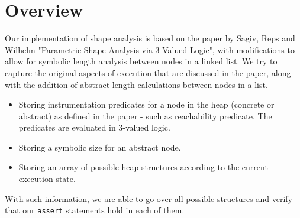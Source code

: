 \section*{Overview}
Our implementation of shape analysis is based on the paper by Sagiv, Reps and Wilhelm "Parametric Shape Analysis via 3-Valued Logic", with modifications to allow for symbolic length analysis between nodes in a linked list. We try to capture the original aspects of execution that are discussed in the paper, along with the addition of abstract length calculations between nodes in a list.
\begin{itemize}
	\item Storing instrumentation predicates for a node in the heap (concrete or abstract) as defined in the paper - such as reachability predicate. The predicates are evaluated in 3-valued logic.
	\item Storing a symbolic size for an abstract node.
	\item Storing an array of possible heap structures according to the current execution state.
\end{itemize}
With such information, we are able to go over all possible structures and verify that our \texttt{assert} statements hold in each of them.